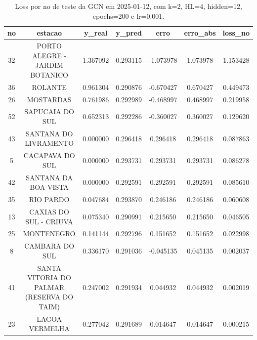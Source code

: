 \begin{table}[h]
\centering
\caption{Loss por no de teste da GCN em 2025-01-12, com k=2, HL=4, hidden=12, epochs=200 e lr=0.001.}
\label{tab:gcn_loss_k2_hl4_h12_e200_d20250112}
\begin{tabular}{ccccccc}
\toprule
no & estacao & y\_real & y\_pred & erro & erro\_abs & loss\_no \\
\midrule
32 & PORTO ALEGRE - JARDIM BOTANICO & 1.367092 & 0.293115 & -1.073978 & 1.073978 & 1.153428 \\
36 & ROLANTE & 0.961304 & 0.290876 & -0.670427 & 0.670427 & 0.449473 \\
26 & MOSTARDAS & 0.761986 & 0.292989 & -0.468997 & 0.468997 & 0.219958 \\
52 & SAPUCAIA DO SUL & 0.652313 & 0.292286 & -0.360027 & 0.360027 & 0.129620 \\
43 & SANTANA DO LIVRAMENTO & 0.000000 & 0.296418 & 0.296418 & 0.296418 & 0.087863 \\
5 & CACAPAVA DO SUL & 0.000000 & 0.293731 & 0.293731 & 0.293731 & 0.086278 \\
42 & SANTANA DA BOA VISTA & 0.000000 & 0.292591 & 0.292591 & 0.292591 & 0.085610 \\
35 & RIO PARDO & 0.047684 & 0.293870 & 0.246186 & 0.246186 & 0.060608 \\
13 & CAXIAS DO SUL - CRIUVA & 0.075340 & 0.290991 & 0.215650 & 0.215650 & 0.046505 \\
25 & MONTENEGRO & 0.141144 & 0.292796 & 0.151652 & 0.151652 & 0.022998 \\
8 & CAMBARA DO SUL & 0.336170 & 0.291036 & -0.045135 & 0.045135 & 0.002037 \\
41 & SANTA VITORIA DO PALMAR (RESERVA DO TAIM) & 0.247002 & 0.291934 & 0.044932 & 0.044932 & 0.002019 \\
23 & LAGOA VERMELHA & 0.277042 & 0.291689 & 0.014647 & 0.014647 & 0.000215 \\
\bottomrule
\end{tabular}
\end{table}
